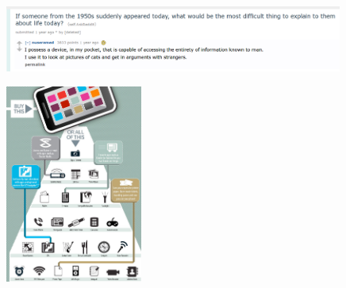 \documentclass[first=dgreen,second=purple,logo=redexc]{aaltoslides}
\begin{document}

\begin{frame} {} 
\begin{figure}
\centering
  \includegraphics[width=0.99\textwidth]{figures/reddit}
\end{figure}

\vspace{-0.75cm}

\begin{figure}
\centering
  \includegraphics[width=0.4\textwidth]{figures/smpreplace.jpg}
\end{figure}
\end{frame} 

\end{document}
